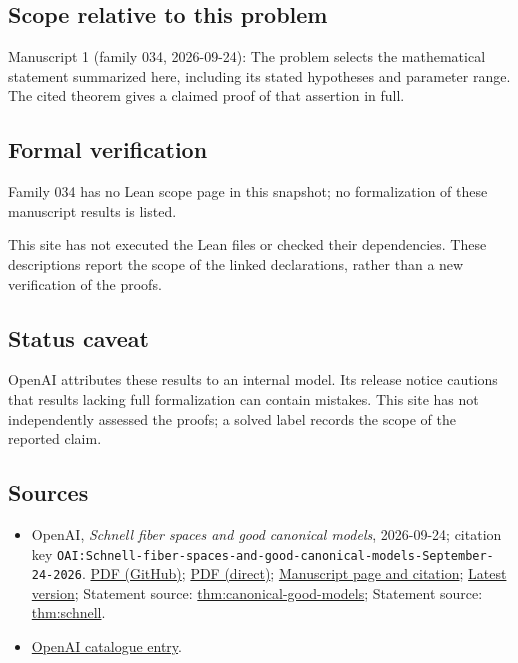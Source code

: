 \documentclass[11pt]{article}
\begin{document}
\subsection{Scope relative to this problem}
Manuscript 1 (family 034, 2026-09-24): The problem selects the mathematical statement summarized here, including its stated hypotheses and parameter range. The cited theorem gives a claimed proof of that assertion in full.

\subsection{Formal verification}
Family 034 has no Lean scope page in this snapshot; no formalization of these manuscript results is listed.

This site has not executed the Lean files or checked their dependencies. These descriptions report the scope of the linked declarations, rather than a new verification of the proofs.

\subsection{Status caveat}
OpenAI attributes these results to an internal model. Its release notice cautions that results lacking full formalization can contain mistakes. This site has not independently assessed the proofs; a solved label records the scope of the reported claim.

\subsection{Sources}
\begin{itemize}
\item OpenAI, \emph{Schnell fiber spaces and good canonical models}, 2026-09-24; citation key \texttt{OAI:Schnell-fiber-spaces-and-good-canonical-models-September-24-2026}. \href{https://github.com/openai/math/blob/adc7f1241b42e322a6451854ab7e4b4c146bf78a/preprints/Schnell-fiber-spaces-and-good-canonical-models-September-24-2026/paper.pdf}{PDF (GitHub)}; \href{https://github.com/openai/math/raw/adc7f1241b42e322a6451854ab7e4b4c146bf78a/preprints/Schnell-fiber-spaces-and-good-canonical-models-September-24-2026/paper.pdf}{PDF (direct)}; \href{https://github.com/openai/math/blob/adc7f1241b42e322a6451854ab7e4b4c146bf78a/preprints/Schnell-fiber-spaces-and-good-canonical-models-September-24-2026/README.md}{Manuscript page and citation}; \href{https://github.com/openai/math/blob/main/preprints/Schnell-fiber-spaces-and-good-canonical-models-September-24-2026/paper.pdf}{Latest version}; Statement source: \href{https://github.com/openai/math/blob/adc7f1241b42e322a6451854ab7e4b4c146bf78a/preprints/Schnell-fiber-spaces-and-good-canonical-models-September-24-2026/build/sections/03-good-model-interface.tex\#L10}{thm:canonical-good-models}; Statement source: \href{https://github.com/openai/math/blob/adc7f1241b42e322a6451854ab7e4b4c146bf78a/preprints/Schnell-fiber-spaces-and-good-canonical-models-September-24-2026/build/sections/01-introduction.tex\#L29}{thm:schnell}.
\item \href{https://github.com/openai/math/blob/adc7f1241b42e322a6451854ab7e4b4c146bf78a/CONTENTS.md}{OpenAI catalogue entry}.
\end{itemize}
\end{document}
